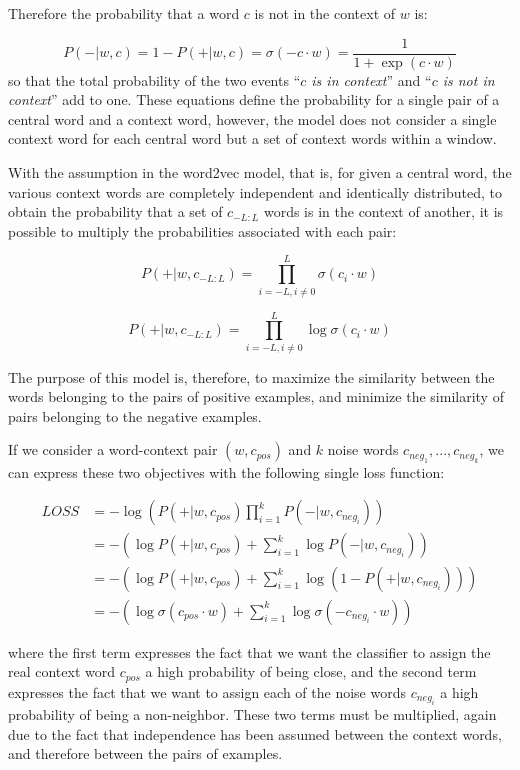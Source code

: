 Therefore the probability that a word $c$ is not in the context of $w$ is:

\[
P(-|w,c) = 1 - P(+|w,c) = \sigma(-c \cdot w) = \frac{1}{1+ \exp (c \cdot w)}
\]
\noindent 
so that the total probability of the two events “\textit{$c$ is in context}” and “\textit{$c$ is not in context}” add to one. These equations define the probability for a single pair of a central word and a context word, however, the model does not consider a single context word for each central word but a set of context words within a window.

With the assumption in the word2vec model, that is, for given a central word, the various context words are completely independent and identically distributed, to obtain the probability that a set of $c_{-L:L}$ words is in the context of another, it is possible to multiply the probabilities associated with each pair:

\[
P(+|w,c_{-L:L}) = \prod _ {i=-L, i \neq 0} ^L \sigma(c_i \cdot w)
\]

\[
P(+|w,c_{-L:L}) = \prod _ {i=-L, i \neq 0} ^L \log \sigma(c_i \cdot w)
\]

The purpose of this model is, therefore, to maximize the similarity between the words belonging to the pairs of positive examples, and minimize the similarity of pairs belonging to the negative examples.

If we consider a word-context pair $(w, c_\mathit{pos})$ and $k$ noise words $c_{\mathit{neg}_1}, ..., c_{\mathit{neg}_k}$, we can express these two objectives with the following single loss function:

\begin{align}
LOSS &= - \log(P(+|w, c_\mathit{pos}) \prod_{i=1}^k P(- | w, c_{\mathit{neg}_i}))  \\
&= -(\log P(+|w, c_\mathit{pos}) + \sum_{i=1}^k \log P(-|w,c_{\mathit{neg}_i})) \\
&= -(\log P(+|w, c_\mathit{pos}) + \sum_{i=1}^k \log (1 - P(+|w, c_{\mathit{neg}_i}))) \\
&= - (\log \sigma(c_\mathit{pos} \cdot w) + \sum_{i=1}^{k} \log \sigma(-c_{\mathit{neg}_i} \cdot w))
\end{align}

where the first term expresses the fact that we want the classifier to assign the real context word $c_\mathit{pos}$ a high probability of being close, and the second term expresses the fact that we want to assign each of the noise words $c_{\mathit{neg}_i}$ a high probability of being a non-neighbor. These two terms must be multiplied, again due to the fact that independence has been assumed between the context words, and therefore between the pairs of examples.

